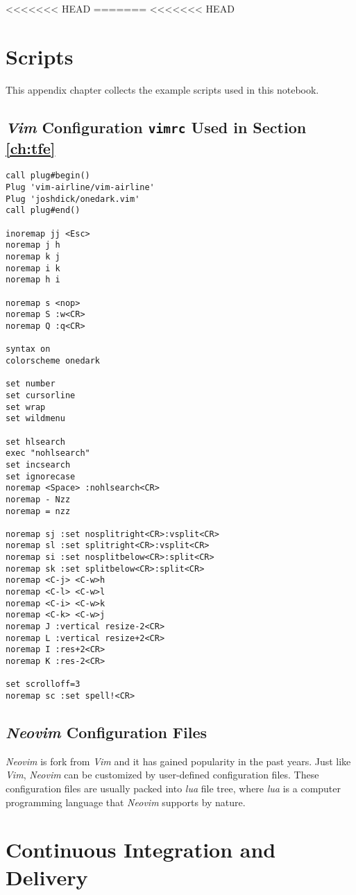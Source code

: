 <<<<<<< HEAD
=======
<<<<<<< HEAD
\chapter{Scripts}

This appendix chapter collects the example scripts used in this notebook.

\section{\textit{Vim} Configuration \texttt{vimrc} Used in Section \ref{ch:tfe}}

\begin{lstlisting}
call plug#begin()
Plug 'vim-airline/vim-airline'
Plug 'joshdick/onedark.vim'
call plug#end()

inoremap jj <Esc>
noremap j h
noremap k j
noremap i k
noremap h i

noremap s <nop>
noremap S :w<CR>
noremap Q :q<CR>

syntax on
colorscheme onedark

set number
set cursorline
set wrap
set wildmenu

set hlsearch
exec "nohlsearch"
set incsearch
set ignorecase
noremap <Space> :nohlsearch<CR>
noremap - Nzz
noremap = nzz

noremap sj :set nosplitright<CR>:vsplit<CR>
noremap sl :set splitright<CR>:vsplit<CR>
noremap si :set nosplitbelow<CR>:split<CR>
noremap sk :set splitbelow<CR>:split<CR>
noremap <C-j> <C-w>h
noremap <C-l> <C-w>l
noremap <C-i> <C-w>k
noremap <C-k> <C-w>j
noremap J :vertical resize-2<CR>
noremap L :vertical resize+2<CR>
noremap I :res+2<CR>
noremap K :res-2<CR>

set scrolloff=3
noremap sc :set spell!<CR>
\end{lstlisting}

\section{\textit{Neovim} Configuration Files}

\textit{Neovim} is fork from \textit{Vim} and it has gained popularity in the past years. Just like \textit{Vim}, \textit{Neovim} can be customized by user-defined configuration files. These configuration files are usually packed into \textit{lua} file tree, where \textit{lua} is a computer programming language that \textit{Neovim} supports by nature.

\chapter{Continuous Integration and Delivery} \label{ch:cicd}

